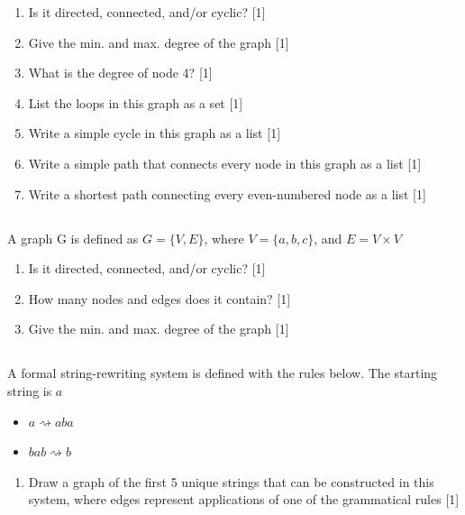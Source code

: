 \documentclass[twocolumn]{article}
\newcounter{pmarks}
\newcounter{marks}
\newcommand\mrk[1]{{\hfill\color{blue}\small[{#1}]}\addtocounter{pmarks}{#1}\addtocounter{marks}{#1}}
\begin{document}
    \begin{enumerate}
        \item Is it directed, connected, and/or cyclic? \mrk{1}
        \item Give the min. and max. degree of the graph \mrk{1}
        \item What is the degree of node 4? \mrk{1}
        \item List the loops in this graph as a set \mrk{1}
        \item Write a simple cycle in this graph as a list \mrk{1}
        \item Write a simple path that connects every node in this graph as a list \mrk{1}
        \item Write a shortest path connecting every even-numbered node as a list \mrk{1}
    \end{enumerate}


\subsection{}

    A graph G is defined as $G = \{V, E\}$, where $V = \{ a, b, c \}$, and $E = V \times V$

    \begin{enumerate}
        \item Is it directed, connected, and/or cyclic? \mrk{1}
        \item How many nodes and edges does it contain? \mrk{1}
        \item Give the min. and max. degree of the graph \mrk{1}
    \end{enumerate}

\subsection{}

    A formal string-rewriting system is defined with the rules below. The starting string is $a$
    
    \begin{itemize}
        \item $ a \rightsquigarrow aba $
        \item $bab \rightsquigarrow b$
    \end{itemize} 

    \begin{enumerate}
        \item Draw a graph of the first 5 unique strings that can be constructed in this system, where edges represent applications of one of the  grammatical rules \mrk{1}
    \end{enumerate}
\end{document}
